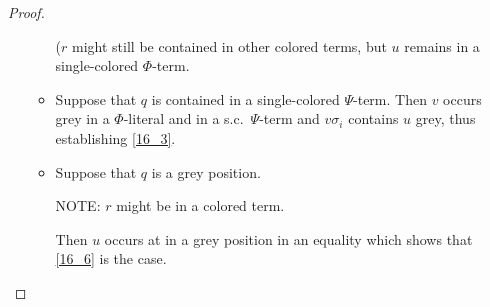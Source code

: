 \documentclass[,%
	draft=false,%
	numbers=noendperiod
	12pt,
	a4paper,
	oneside,%
	openany,
]{memoir}
\begin{document}
\begin{proof}
\begin{itemize}
\begin{itemize}
							($r$ might still be contained in other colored terms, but $u$ remains in a single-colored $\Phi$-term.

						\item Suppose that $q$ is contained in a single-colored $\Psi$-term.
							Then $v$ occurs grey in a $\Phi$-literal and in a s.c.\ $\Psi$-term and $v\sigma_i$ contains $u$ grey, thus establishing \ref{16_3}.


						\item Suppose that $q$ is a grey position.

							NOTE: $r$ might be in a colored term.

							Then $u$ occurs at in a grey position in an equality which shows that \ref{16_6} is the case.


					\end{itemize}

	\end{itemize}

\end{proof}
\end{document}
